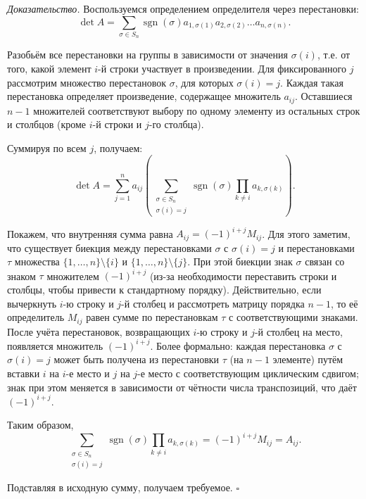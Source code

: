 \documentclass[a4paper,12pt]{article}
\theoremstyle{definition}
\theoremstyle{plain}
\theoremstyle{remark}
\begin{document}
	\medskip
	\textit{Доказательство.}
	Воспользуемся определением определителя через перестановки:
	\[
	\det A = \sum_{\sigma \in S_n} \operatorname{sgn}(\sigma) a_{1,\sigma(1)} a_{2,\sigma(2)} \dots a_{n,\sigma(n)}.
	\]
	
	Разобьём все перестановки на группы в зависимости от значения \( \sigma(i) \), т.е. от того, какой элемент \( i \)-й строки участвует в произведении. Для фиксированного \( j \) рассмотрим множество перестановок \( \sigma \), для которых \( \sigma(i) = j \). Каждая такая перестановка определяет произведение, содержащее множитель \( a_{ij} \). Оставшиеся \( n-1 \) множителей соответствуют выбору по одному элементу из остальных строк и столбцов (кроме \( i \)-й строки и \( j \)-го столбца).
	
	Суммируя по всем \( j \), получаем:
	\[
	\det A = \sum_{j=1}^{n} a_{ij} \left( \sum_{\substack{\sigma \in S_n \\ \sigma(i)=j}} \operatorname{sgn}(\sigma) \prod_{k \neq i} a_{k,\sigma(k)} \right).
	\]
	
	Покажем, что внутренняя сумма равна \( A_{ij} = (-1)^{i+j} M_{ij} \). Для этого заметим, что существует биекция между перестановками \( \sigma \) с \( \sigma(i)=j \) и перестановками \( \tau \) множества \( \{1,\dots,n\}\setminus\{i\} \) и \( \{1,\dots,n\}\setminus\{j\} \). При этой биекции знак \( \sigma \) связан со знаком \( \tau \) множителем \( (-1)^{i+j} \) (из-за необходимости переставить строки и столбцы, чтобы привести к стандартному порядку). Действительно, если вычеркнуть \( i \)-ю строку и \( j \)-й столбец и рассмотреть матрицу порядка \( n-1 \), то её определитель \( M_{ij} \) равен сумме по перестановкам \( \tau \) с соответствующими знаками. После учёта перестановок, возвращающих \( i \)-ю строку и \( j \)-й столбец на место, появляется множитель \( (-1)^{i+j} \). Более формально: каждая перестановка \( \sigma \) с \( \sigma(i)=j \) может быть получена из перестановки \( \tau \) (на \( n-1 \) элементе) путём вставки \( i \) на \( i \)-е место и \( j \) на \( j \)-е место с соответствующим циклическим сдвигом; знак при этом меняется в зависимости от чётности числа транспозиций, что даёт \( (-1)^{i+j} \).
	
	Таким образом,
	\[
	\sum_{\substack{\sigma \in S_n \\ \sigma(i)=j}} \operatorname{sgn}(\sigma) \prod_{k \neq i} a_{k,\sigma(k)} = (-1)^{i+j} M_{ij} = A_{ij}.
	\]
	
	Подставляя в исходную сумму, получаем требуемое. \hfill \(\square\)
	
\end{document}
